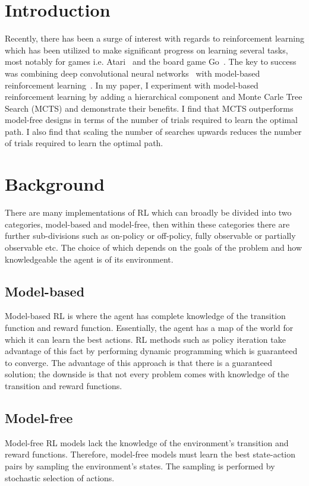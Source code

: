 \section{Introduction}
Recently, there has been a surge of interest with regards to reinforcement learning which has been utilized to make significant progress on learning several tasks, most notably for games i.e. Atari~\cite{mnih2015human} and the board game Go~\cite{silver2016mastering}. The key to success was combining deep convolutional neural networks~\cite{krizhevsky2012imagenet} with model-based reinforcement learning~\cite{sutton1998reinforcement}. In my paper, I experiment with model-based reinforcement learning by adding a hierarchical component and Monte Carle Tree Search (MCTS) and demonstrate their benefits. I find that MCTS outperforms model-free designs in terms of the number of trials required to learn the optimal path. I also find that scaling the number of searches upwards reduces the number of trials required to learn the optimal path.

\section{Background}
There are many implementations of RL which can broadly be divided into two categories, model-based and model-free, then within these categories there are further sub-divisions such as on-policy or off-policy, fully observable or partially observable etc. The choice of which depends on the goals of the problem and how knowledgeable the agent is of its environment.

\subsection{Model-based}
Model-based RL is where the agent has complete knowledge of the transition function and reward function. Essentially, the agent has a map of the world for which it can learn the best actions. RL methods such as policy iteration take advantage of this fact by performing dynamic programming which is guaranteed to converge. The advantage of this approach is that there is a guaranteed solution; the downside is that not every problem comes with knowledge of the transition and reward functions.

\subsection{Model-free}
Model-free RL models lack the knowledge of the environment's transition and reward functions. Therefore, model-free models must learn the best state-action pairs by sampling the environment's states. The sampling is performed by stochastic selection of actions.
 
